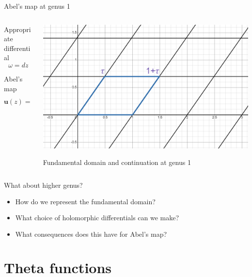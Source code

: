 \documentclass[11pt,aspectratio=169]{beamer}
\begin{document}
\begin{frame}{Abel's map at genus 1}
    \begin{columns}[onlytextwidth]
        \begin{column}{0.55\textwidth}
            Appropriate differential
            \[\omega = dz\]
            
            Abel's map
            \[\mathbf{u}(z) = \int_0^z \omega = z\]
        \end{column}
        \begin{column}{0.45\textwidth}
            \center{}
            \includegraphics[width=\columnwidth]{assets/Domain.png}

            \tiny Fundamental domain and continuation at genus 1
        \end{column}
    \end{columns}

    \pause{}

    {
    \begin{block}{What about higher genus?}
        \begin{itemize}
            \item How do we represent the fundamental domain?
            \item What choice of holomorphic differentials can we make?
            \item What consequences does this have for Abel's map?
        \end{itemize}
    \end{block}
    }
\end{frame}

\section{Theta functions}
\end{document}
